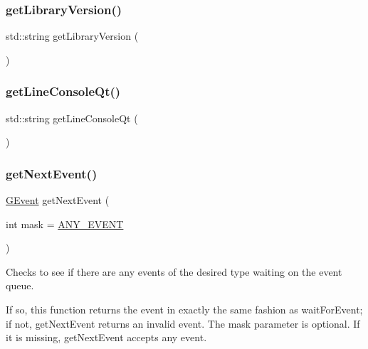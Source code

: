 \mbox{\label{namespacesgl_acfe02dedce4026ebabe4a4e4806795ab}} 
\subsubsection{\texorpdfstring{get\+Library\+Version()}{getLibraryVersion()}}
{\footnotesize\ttfamily std\+::string get\+Library\+Version (\begin{DoxyParamCaption}{ }\end{DoxyParamCaption})}

\mbox{\label{namespacesgl_ac9d3e41f643b89ff2ecbe0afc84072af}} 
\subsubsection{\texorpdfstring{get\+Line\+Console\+Qt()}{getLineConsoleQt()}}
{\footnotesize\ttfamily std\+::string get\+Line\+Console\+Qt (\begin{DoxyParamCaption}{ }\end{DoxyParamCaption})}

\mbox{\label{namespacesgl_a2cc1dab98b5712012e365c8afdc04bc4}} 
\subsubsection{\texorpdfstring{get\+Next\+Event()}{getNextEvent()}}
{\footnotesize\ttfamily \mbox{\hyperlink{classsgl_1_1GEvent}{G\+Event}} get\+Next\+Event (\begin{DoxyParamCaption}\item[{int}]{mask = {\ttfamily \mbox{\hyperlink{namespacesgl_a6ff6e8ee75a08092e30167b2b7c5d6f7adb39e2dc0584d3e28dad8abaa4b926b7}{A\+N\+Y\+\_\+\+E\+V\+E\+NT}}} }\end{DoxyParamCaption})}



Checks to see if there are any events of the desired type waiting on the event queue. 

If so, this function returns the event in exactly the same fashion as {\ttfamily wait\+For\+Event}; if not, {\ttfamily get\+Next\+Event} returns an invalid event. The {\ttfamily mask} parameter is optional. If it is missing, {\ttfamily get\+Next\+Event} accepts any event.

